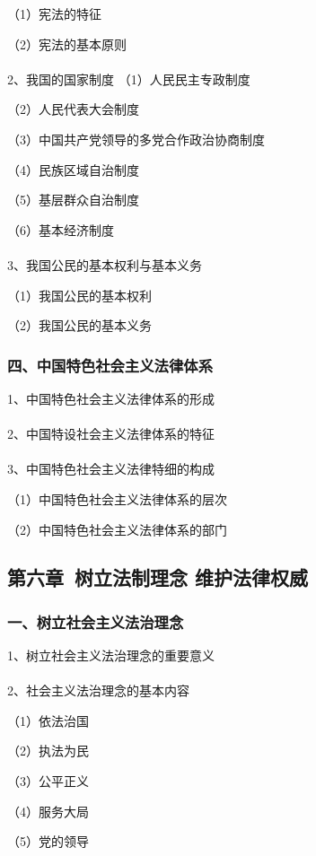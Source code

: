 \documentclass{ctexart}
\begin{document}
（1）宪法的特征

（2）宪法的基本原则
\\\\

2、我国的国家制度
（1）人民民主专政制度

（2）人民代表大会制度

（3）中国共产党领导的多党合作政治协商制度

（4）民族区域自治制度

（5）基层群众自治制度

（6）基本经济制度
\\\\

3、我国公民的基本权利与基本义务

（1）我国公民的基本权利

（2）我国公民的基本义务

\subsubsection{四、中国特色社会主义法律体系}
1、中国特色社会主义法律体系的形成
\\\\

2、中国特设社会主义法律体系的特征
\\\\

3、中国特色社会主义法律特细的构成

（1）中国特色社会主义法律体系的层次

（2）中国特色社会主义法律体系的部门


\subsection{第六章\ 树立法制理念 维护法律权威}
\subsubsection{一、树立社会主义法治理念}

1、树立社会主义法治理念的重要意义
\\\\

2、社会主义法治理念的基本内容

（1）依法治国

（2）执法为民

（3）公平正义

（4）服务大局

（5）党的领导
\\\\
\end{document}
